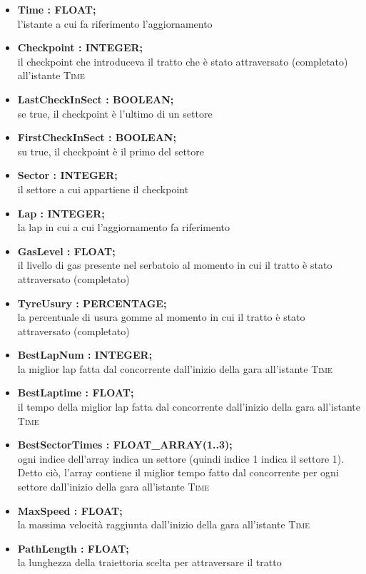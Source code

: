 \begin{itemize}
      \item\textbf{Time : FLOAT;}\\l'istante a cui fa riferimento l'aggiornamento
      \item\textbf{Checkpoint : INTEGER;}\\il checkpoint che introduceva il tratto che \`{e} stato attraversato (completato) all'istante \textsc{Time}
      \item\textbf{LastCheckInSect : BOOLEAN;}\\se true, il checkpoint \`{e} l'ultimo di un settore
      \item\textbf{FirstCheckInSect : BOOLEAN;}\\su true, il checkpoint \`{e} il primo del settore
      \item\textbf{Sector : INTEGER;}\\il settore a cui appartiene il checkpoint
      \item\textbf{Lap : INTEGER;}\\la lap in cui a cui l'aggiornamento fa riferimento
      \item\textbf{GasLevel : FLOAT;}\\il livello di gas presente nel serbatoio al momento in cui il tratto \`{e} stato attraversato (completato)
      \item\textbf{TyreUsury : PERCENTAGE;}\\la percentuale di usura gomme al momento in cui il tratto \`{e} stato attraversato (completato)
      \item\textbf{BestLapNum : INTEGER;}\\la miglior lap fatta dal concorrente dall'inizio della gara all'istante \textsc{Time}
      \item\textbf{BestLaptime : FLOAT;}\\il tempo della miglior lap fatta dal concorrente dall'inizio della gara all'istante \textsc{Time}
      \item\textbf{BestSectorTimes : FLOAT\_ARRAY(1..3);}\\ogni indice dell'array indica un settore (quindi indice 1 indica il settore 1). Detto ci\`{o},
      l'array contiene il miglior tempo fatto dal concorrente per ogni settore dall'inizio della gara all'istante \textsc{Time}
      \item\textbf{MaxSpeed : FLOAT;}\\la massima velocit\`{a} raggiunta dall'inizio della gara all'istante \textsc{Time}
      \item\textbf{PathLength : FLOAT;}\\la lunghezza della traiettoria scelta per attraversare il tratto
\end{itemize}
